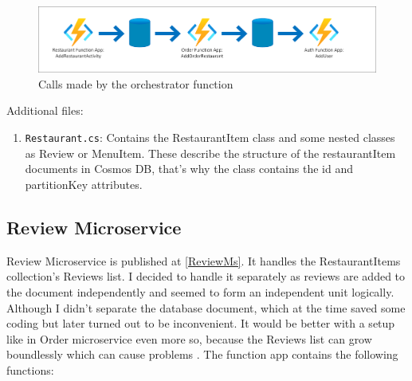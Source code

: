\begin{enumerate}
	\begin{figure}[!ht]
		\centering
		\includegraphics[width=150mm, keepaspectratio]{figures/Durable}
		\caption{Calls made by the orchestrator function} 
		\label{fig:durable}
	\end{figure}
	
\end{enumerate}

Additional files: 

\begin{enumerate}
	\item \verb+Restaurant.cs+: Contains the RestaurantItem class and some nested classes as Review or MenuItem. These describe the structure of the restaurantItem documents in Cosmos DB, that's why the class contains the id and partitionKey attributes.
\end{enumerate}

\subsection{Review Microservice}\label{ReviewMicroservice}

Review Microservice is published at \ref{ReviewMs}. It handles the RestaurantItems collection's Reviews list. I decided to handle it separately as reviews are added to the document independently and seemed to form an independent unit logically. Although I didn't separate the database document, which at the time saved some coding but later turned out to be inconvenient. It would be better with a setup like in Order microservice even more so, because the Reviews list can grow boundlessly which can cause problems \cite{NoSQLArrays}. The function app contains the following functions:

